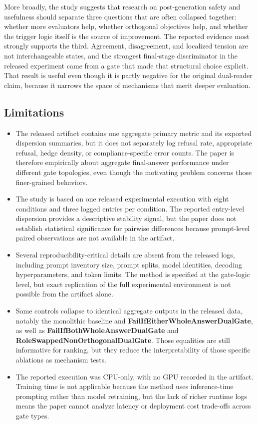 \documentclass{article}
\begin{document}
More broadly, the study suggests that research on post-generation safety and usefulness should separate three questions that are often collapsed together: whether more evaluators help, whether orthogonal objectives help, and whether the trigger logic itself is the source of improvement. The reported evidence most strongly supports the third. Agreement, disagreement, and localized tension are not interchangeable states, and the strongest final-stage discriminator in the released experiment came from a gate that made that structural choice explicit. That result is useful even though it is partly negative for the original dual-reader claim, because it narrows the space of mechanisms that merit deeper evaluation.

\subsection{Limitations}

\label{sec:limitations}

\begin{itemize}
  \item The released artifact contains one aggregate primary metric and its exported dispersion summaries, but it does not separately log refusal rate, appropriate refusal, hedge density, or compliance-specific error counts. The paper is therefore empirically about aggregate final-answer performance under different gate topologies, even though the motivating problem concerns those finer-grained behaviors.
  \item The study is based on one released experimental execution with eight conditions and three logged entries per condition. The reported entry-level dispersion provides a descriptive stability signal, but the paper does not establish statistical significance for pairwise differences because prompt-level paired observations are not available in the artifact.
  \item Several reproducibility-critical details are absent from the released logs, including prompt inventory size, prompt splits, model identities, decoding hyperparameters, and token limits. The method is specified at the gate-logic level, but exact replication of the full experimental environment is not possible from the artifact alone.
  \item Some controls collapse to identical aggregate outputs in the released data, notably the monolithic baseline and \textbf{FailIfEitherWholeAnswerDualGate}, as well as \textbf{FailIfBothWholeAnswerDualGate} and \textbf{RoleSwappedNonOrthogonalDualGate}. Those equalities are still informative for ranking, but they reduce the interpretability of those specific ablations as mechanism tests.
  \item The reported execution was CPU-only, with no GPU recorded in the artifact. Training time is not applicable because the method uses inference-time prompting rather than model retraining, but the lack of richer runtime logs means the paper cannot analyze latency or deployment cost trade-offs across gate types.
\end{itemize}
\end{document}
